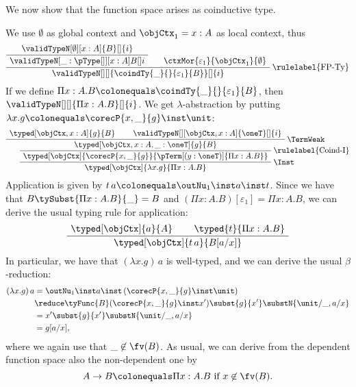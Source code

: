 \documentclass[preprint]{sigplanconf}
\begin{document}
We now show that the function space arises as coinductive type.
\begin{example}
  \label{ex:pi-encode}
  We use $\emptyset$ as global context and $\objCtx_1 = x : A$ as local
  context, thus
  \begin{gather*}
    \AxiomC{$\validTypeN[\emptyset][x : A]{B}[]{i}$}
    \UnaryInfC{$\validTypeN[\_ : {\pType[]}][x : A]{B}[]{i}$}
    \AxiomC{$\ctxMor{\varepsilon_1}{\objCtx_1}{\emptyset}$}
    \RightLabel{\rulelabel{FP-Ty}}
    \BinaryInfC{$
      \validTypeN[][]{\coindTy{\_}{}{\varepsilon_1}{B}}[]{i}$}
    \DisplayProof
  \end{gather*}
  If we define
  $\cramped{\Pi x:A. B \colonequals \coindTy{\_}{}{\varepsilon_1}{B}}$,
  then $\cramped{\validTypeN[][]{\Pi x:A. B}[]{i}}$.
  We get $\lambda$-abstraction by putting
  $\lambda x. g \colonequals \corecP{x, \_}{g} \inst \unit$:
  \begin{equation*}
    \AxiomC{$\typed[\objCtx, x:A]{g}{B}$}
    \AxiomC{$\validTypeN[][\objCtx,x:A]{\oneT}[]{i}$}
    \RightLabel{\TermWeak}
    \BinaryInfC{$\typed[\objCtx, x:A, \_ : \oneT]{g}{B}$}
    \RightLabel{\rulelabel{Coind-I}}
    \UnaryInfC{$\typed[\objCtx]{\corecP{x, \_}{g}}
      {\pTerm[(y : \oneT)]{\Pi x:A.B}}$}
\RightLabel{\Inst}
    \UnaryInfC{$\typed[\objCtx]
      {\lambda x. g}
      {\Pi x:A.B}$}
    \DisplayProof
  \end{equation*}
  Application is given by
  $t \, a \colonequals \outNu_1 \inst a \inst t$.
  Since we have that $B \tySubst{\Pi x:A.B}{\_} = B$ and
  $(\Pi x : A.B) [\varepsilon_1] = \Pi x : A.B$, we can derive the usual typing
  rule for application:
  \begin{equation*}
    \AxiomC{$\typed[\objCtx]{a}{A}$}
    \AxiomC{$\typed{t}{\Pi x:A. B}$}
    \BinaryInfC{$\typed[\objCtx]{t \, a}{B[a/x]}$}
    \DisplayProof
  \end{equation*}
In particular, we have that $(\lambda x. g) \, a$ is well-typed, and
  we can derive the usual $\beta$-reduction:
  \begin{align*}
    (\lambda x. g) \, a
    & = \outNu_1 \inst a \inst \, (\corecP{x, \_{}}{g} \inst \unit) \\
    & \reduce \tyFunc{B}(\corecP{x, \_{}}{g} \inst x')
    \subst{g}{x'} \substN{\unit/\_, a/x} \\
    & = x' \subst{g}{x'} \substN{\unit/\_, a/x} \\
& = g[a/x],
  \end{align*}
  where we again use that $\_ \not\in \fv(B)$.
  As usual, we can derive from the dependent function space also the
  non-dependent one by
  \begin{equation*}
     A \to B \colonequals \Pi x:A. B \text{ if } x \not\in \fv(B).
  \end{equation*}


\end{example}
\end{document}
